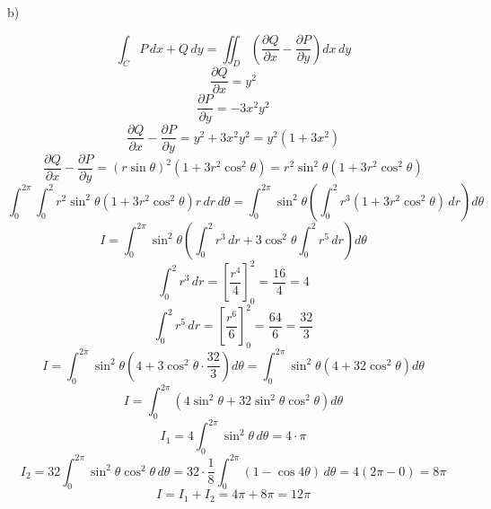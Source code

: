 \documentclass{report}
\begin{document}
{    b) 

    \[ \int_{C} P\,dx + Q\,dy = \iint_{D} \left( \frac{\partial Q}{\partial x} - \frac{\partial P}{\partial y} \right) dx\,dy \]
    \[ \frac{\partial Q}{\partial x} = y^2 \]
    \[ \frac{\partial P}{\partial y} = -3x^2 y^2 \]
    \[ \frac{\partial Q}{\partial x} - \frac{\partial P}{\partial y} = y^2 + 3x^2 y^2 = y^2 (1 + 3x^2) \]
    \[ \frac{\partial Q}{\partial x} - \frac{\partial P}{\partial y} = (r\sin\theta)^2 \left(1 + 3r^2 \cos^2\theta\right) = r^2 \sin^2\theta \left(1 + 3r^2 \cos^2\theta\right) \]
    \[ \int_{0}^{2\pi} \int_{0}^{2} r^2 \sin^2\theta \left(1 + 3r^2 \cos^2\theta\right) r\,dr\,d\theta = \int_{0}^{2\pi} \sin^2\theta \left( \int_{0}^{2} r^3 (1 + 3r^2 \cos^2\theta)\,dr \right) d\theta \]
    \[ I = \int_{0}^{2\pi} \sin^2\theta \left( \int_{0}^{2} r^3\,dr + 3\cos^2\theta \int_{0}^{2} r^5\,dr \right) d\theta \]
    \[ \int_{0}^{2} r^3\,dr = \left[ \frac{r^4}{4} \right]_0^2 = \frac{16}{4} = 4 \]
    \[ \int_{0}^{2} r^5\,dr = \left[ \frac{r^6}{6} \right]_0^2 = \frac{64}{6} = \frac{32}{3} \]
    \[ I = \int_{0}^{2\pi} \sin^2\theta \left( 4 + 3\cos^2\theta \cdot \frac{32}{3} \right) d\theta = \int_{0}^{2\pi} \sin^2\theta \left(4 + 32\cos^2\theta \right) d\theta \]
    \[ I = \int_{0}^{2\pi} \left( 4\sin^2\theta + 32\sin^2\theta \cos^2\theta \right) d\theta \]
    \[ I_1 = 4 \int_{0}^{2\pi} \sin^2\theta\,d\theta = 4 \cdot \pi \]
    \[ I_2 = 32 \int_{0}^{2\pi} \sin^2\theta \cos^2\theta\,d\theta = 32 \cdot \frac{1}{8} \int_{0}^{2\pi} (1 - \cos 4\theta)\,d\theta = 4 \left( 2\pi - 0 \right) = 8\pi \]
    \[ I = I_1 + I_2 = 4\pi + 8\pi = \boxed{12\pi} \]
}


\end{document}
